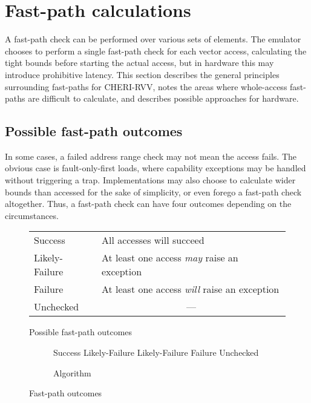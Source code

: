 \section{Fast-path calculations\label{chap:hardware:sec:fastpath}}
A fast-path check can be performed over various sets of elements.
The emulator chooses to perform a single fast-path check for each vector access, calculating the tight bounds before starting the actual access, but in hardware this may introduce prohibitive latency.
This section describes the general principles surrounding fast-paths for CHERI-RVV, notes the areas where whole-access fast-paths are difficult to calculate, and describes possible approaches for hardware.

\subsection{Possible fast-path outcomes}
In some cases, a failed address range check may not mean the access fails.
The obvious case is fault-only-first loads, where capability exceptions may be handled without triggering a trap.
Implementations may also choose to calculate wider bounds than accessed for the sake of simplicity, or even forego a fast-path check altogether.
Thus, a fast-path check can have four outcomes depending on the circumstances.

\begin{figure}
\begin{subtable}{0.5\textwidth}
    \begin{tabular}{p{}p{}}
        \toprule
        Success & All accesses will succeed \\
        Likely-Failure & At least one access \emph{may} raise an exception \\
        Failure & At least one access \emph{will} raise an exception \\
        Unchecked & \multicolumn{1}{c}{---} \\
        \bottomrule
    \end{tabular}
    \caption{Possible fast-path outcomes}
\end{subtable}%
\hfill%
\begin{subfigure}{0.45\textwidth}
    \begin{algorithmic}
                \State Success
                \State Likely-Failure
                \State Likely-Failure
            \Else{}
                \State Failure
            \EndIf{}
        \Else{}
            \State Unchecked
        \EndIf{}
    \end{algorithmic}
    \caption{Algorithm}
\end{subfigure}
\caption{Fast-path outcomes}
\end{figure}

